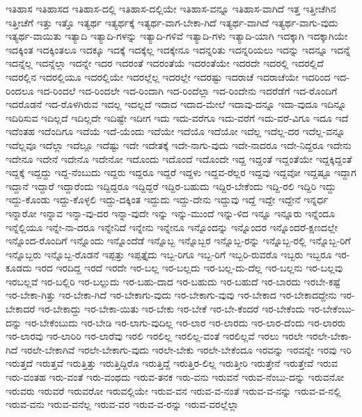 {ಇತಿಹಾಸ
ಇತಿಹಾಸದ
ಇತಿಹಾಸ-ದಲ್ಲಿ
ಇತಿಹಾಸ-ದಲ್ಲಿಯೇ
ಇತಿಹಾಸ-ವನ್ನೂ
ಇತಿಹಾಸ-ವಾಗಿದೆ
ಇತ್ತ
ಇತ್ತೀಚೆಗಿನ
ಇತ್ತೀಚೆಗೆ
ಇತ್ತು
ಇತ್ತೊ
ಇತ್ಯರ್ಥ
ಇತ್ಯರ್ಥಕ್ಕೆ
ಇತ್ಯರ್ಥ-ವಾಗ-ಬೇಕಾ-ಗಿದೆ
ಇತ್ಯರ್ಥ-ವಾಗಿದೆ
ಇತ್ಯರ್ಥ-ವಾಗು-ವುದು
ಇತ್ಯರ್ಥ-ವಾಯಿತು
ಇತ್ಯಾದಿ
ಇತ್ಯಾದಿ-ಗಳನ್ನು
ಇತ್ಯಾದಿ-ಗಳಿವೆ
ಇತ್ಯಾದಿ-ಗಳು
ಇತ್ಯಾದಿ-ಯಾಗಿ
ಇದಕ್ಕಾಗಿ
ಇದಕ್ಕಾಗಿಯೇ
ಇದಕ್ಕಿಂತ
ಇದಕ್ಕಿಂತಲೂ
ಇದಕ್ಕೂ
ಇದಕ್ಕೆ
ಇದಕ್ಕೆಲ್ಲ
ಇದಕ್ಕೇನೂ
ಇದನ್ನರಿತು
ಇದನ್ನರಿಯಲು
ಇದನ್ನು
ಇದನ್ನೂ
ಇದನ್ನೆ
ಇದನ್ನೆಲ್ಲ
ಇದನ್ನೆಲ್ಲಾ
ಇದನ್ನೇ
ಇದರ
ಇದರಂತೆ
ಇದರಂತೆಯೆ
ಇದರಂತೆಯೇ
ಇದರದೇ
ಇದರಲ್ಲಿ
ಇದರಲ್ಲಿದೆ
ಇದರಲ್ಲಿನ
ಇದರಲ್ಲಿಯೂ
ಇದರಲ್ಲಿಯೇ
ಇದರಲ್ಲೆಲ್ಲ
ಇದರಲ್ಲೇ
ಇದರಷ್ಟು
ಇದರಾಚೆ
ಇದರಾಚೆಯೇ
ಇದರಿಂದ
ಇದ-ರಿಂದಲೂ
ಇದ-ರಿಂದಲೆ
ಇದ-ರಿಂದಲೇ
ಇದ-ರಿಂದಾಗಿ
ಇದ-ರಿಂದೆಲ್ಲಾ
ಇದ-ರಿಂದೇನು
ಇದರೆಡೆಗೆ
ಇದ-ರೊಂದಿಗೆ
ಇದರೊಡನೆ
ಇದ-ರೊಳಗಿರುವ
ಇದಲ್ಲ
ಇದಲ್ಲದೆ
ಇದಾದ
ಇದಾದ-ಮೇಲೆ
ಇದಾವು-ದನ್ನೂ
ಇದಾ-ವುದೂ
ಇದಿನ್ನೂ
ಇದಿರಿಸುವ
ಇದಿಲ್ಲದೆ
ಇದಿಲ್ಲದೇ
ಇದಿಷ್ಟೇ
ಇದೀಗ
ಇದು
ಇದು-ವರೆಗೂ
ಇದು-ವರೆಗೆ
ಇದು-ವರೆ-ವಿಗೂ
ಇದೂ
ಇದೆ
ಇದೆಂತಹ
ಇದೆಂದಿಗೂ
ಇದೆಯೆ
ಇದೆ-ಯೆಂದು
ಇದೆಯೇ
ಇದೆಯೊ
ಇದೆಯೋ
ಇದೆಲ್ಲ
ಇದೆಲ್ಲ-ದರ
ಇದೆಲ್ಲ-ವನ್ನೂ
ಇದೆಲ್ಲವೂ
ಇದೆಲ್ಲಾ
ಇದೆಲ್ಲೂ
ಇದೆಷ್ಟು
ಇದೇ
ಇದೇತಕ್ಕೆ
ಇದೇ-ನಾಗು-ವುದು
ಇದೇ-ನಾದರೂ
ಇದೇ-ನಿದ್ದರೂ
ಇದೇನು
ಇದೇನೂ
ಇದೇನೆ
ಇದೇನೊ
ಇದೇನೋ
ಇದೊಂದು
ಇದೊಂದೆ
ಇದೊಂದೇ
ಇದ್ದ
ಇದ್ದಂತೆ
ಇದ್ದಂತೆಯೇ
ಇದ್ದಕ್ಕಿದ್ದಂತೆ
ಇದ್ದಕ್ಕೆ
ಇದ್ದದ್ದು
ಇದ್ದ-ನೆಂಬುದು
ಇದ್ದರು
ಇದ್ದರೂ
ಇದ್ದರೆ
ಇದ್ದಳು
ಇದ್ದವ-ರೆಲ್ಲರ
ಇದ್ದವು
ಇದ್ದವೋ
ಇದ್ದಷ್ಟೂ
ಇದ್ದಾಗ
ಇದ್ದಾನೆ
ಇದ್ದಾರೆ
ಇದ್ದಾರೆಂದು
ಇದ್ದಿದ್ದರೂ
ಇದ್ದಿದ್ದರೆ
ಇದ್ದಿರ-ಬಹುದು
ಇದ್ದಿರ-ಬೇಕೆಂದು
ಇದ್ದಿ-ರಲಿ
ಇದ್ದಿರಿ
ಇದ್ದು
ಇದ್ದು-ಕೊಂಡು
ಇದ್ದು-ಕೊಳ್ಳಲಿ
ಇದ್ದು-ದಕ್ಕಿಂತ
ಇದ್ದುದು
ಇದ್ದು-ದೇನು
ಇದ್ದುವು
ಇದ್ದೆ
ಇದ್ದೇ
ಇದ್ದೇನೆ
ಇನ್ನರ್ಧ
ಇನ್ನಾರೋ
ಇನ್ನಾವ
ಇನ್ನಾ-ವು-ದರ
ಇನ್ನಾ-ವುದೇ
ಇನ್ನು
ಇನ್ನು-ಮುಂದೆ
ಇನ್ನು-ಳಿದ
ಇನ್ನೂ
ಇನ್ನೂರು
ಇನ್ನೆಂದೂ
ಇನ್ನೆಲ್ಲಿಯೂ
ಇನ್ನೇ-ನಾ-ದರೂ
ಇನ್ನೇನಿದೆ
ಇನ್ನೇನು
ಇನ್ನೇನೂ
ಇನ್ನೊಂದನ್ನು
ಇನ್ನೊಂದರ
ಇನ್ನೊಂದರೆ-ಕ್ಷಣದಲ್ಲೇ
ಇನ್ನೊಂದ-ರೊಂದಿಗೆ
ಇನ್ನೊಂದು
ಇನ್ನೊಂದೆಡೆ
ಇನ್ನೊಬ್ಬ
ಇನ್ನೊಬ್ಬರ
ಇನ್ನೊಬ್ಬ-ರನ್ನು
ಇನ್ನೊಬ್ಬ-ರಲ್ಲಿ
ಇನ್ನೊಬ್ಬ-ರಿಗೆ
ಇನ್ನೊಬ್ಬರು
ಇನ್ನೊಬ್ಬ-ರೊಡನೆ
ಇಪ್ಪತ್ತು
ಇಪ್ಪತ್ತೈದು
ಇಬ್ಬ-ರಿಗೂ
ಇಬ್ಬ-ರಿಗೆ
ಇಬ್ಬರಿ-ರುವರೊ
ಇಬ್ಬರು
ಇಬ್ಬರೂ
ಇರ-ಕೂಡದು
ಇರದ
ಇರದಿದ್ದ
ಇರದೆ
ಇರದೇ
ಇರ-ಬಲ್ಲ
ಇರ-ಬಲ್ಲದು
ಇರ-ಬಲ್ಲ-ದು-ದೆಲ್ಲ
ಇರ-ಬಲ್ಲನು
ಇರ-ಬಲ್ಲವು
ಇರಬಲ್ಲವೆ
ಇರ-ಬಲ್ಲಿರಿ
ಇರ-ಬಲ್ಲುದು
ಇರ-ಬಹು-ದಾದ
ಇರ-ಬಹುದು
ಇರ-ಬಹುದೆ
ಇರ-ಬಾರದು
ಇರಬೇ-ಕಷ್ಟೆ
ಇರ-ಬೇಕಾ-ಗಿತ್ತು
ಇರ-ಬೇಕಾ-ಗಿದೆ
ಇರ-ಬೇಕಾಗು-ವುದು
ಇರ-ಬೇಕಾಗು-ವುವು
ಇರ-ಬೇಕಾದ
ಇರ-ಬೇಕಾದದ್ದೇನು
ಇರ-ಬೇಕಾದರೆ
ಇರ-ಬೇಕಾದ್ದು
ಇರ-ಬೇಕಾ-ಯಿತು
ಇರ-ಬೇಕು
ಇರ-ಬೇಕೆ
ಇರ-ಬೇ-ಕೆಂದರೆ
ಇರ-ಬೇಕೆಂದು
ಇರ-ಬೇಕೆಂಬು-ದನ್ನು
ಇರ-ಬೇಕೆಂಬುದು
ಇರ-ಬೇಡಿ
ಇರ-ಲಾಗು-ವುದಿಲ್ಲ
ಇರ-ಲಾರ
ಇರ-ಲಾರದು
ಇರ-ಲಾರ-ದೆಂದು
ಇರ-ಲಾರರು
ಇರ-ಲಾರವು
ಇರ-ಲಾರಿರಿ
ಇರ-ಲಾರೆವು
ಇರಲಿ
ಇರಲಿಲ್ಲ
ಇರಲಿಲ್ಲ-ವಂತೆ
ಇರಲಿಲ್ಲವೆ
ಇರಲು
ಇರಲೇ
ಇರಲೇ-ಬೇಕಾ-ಗಿದೆ
ಇರಲೇ-ಬೇಕಾಗಿವೆ
ಇರಲೇ-ಬೇಕಾಗು-ವುದು
ಇರಲೇ-ಬೇಕು
ಇರಲೇ-ಬೇಕೆಂದೂ
ಇರವನ್ನು
ಇರವನ್ನೇ
ಇರವು
ಇರಿ
ಇರುತ್ತದೆ
ಇರುತ್ತವೆ
ಇರುತ್ತಿತ್ತು
ಇರುತ್ತಿದ್ದಿರೊ
ಇರುತ್ತಿದ್ದೆ
ಇರುತ್ತಿರ-ಲಿಲ್ಲ
ಇರುತ್ತೀರಿ
ಇರುತ್ತೇನೆ
ಇರುತ್ತೇವೆ
ಇರುವ
ಇರು-ವಂತಹ
ಇರು-ವಂತೆ
ಇರು-ವಂಥದು
ಇರುವ-ತನಕ
ಇರು-ವನು
ಇರುವನೆ
ಇರುವ-ನೆಂಬು-ದನ್ನು
ಇರುವನೋ
ಇರುವರು
ಇರುವರೆ
ಇರುವರೋ
ಇರುವಲ್ಲಿಯೇ
ಇರುವ-ವನ
ಇರುವ-ವ-ನಂತೆ
ಇರುವ-ವ-ನನ್ನು
ಇರುವ-ವ-ನಲ್ಲಿ
ಇರುವ-ವನು
ಇರುವ-ವನೆಲ್ಲ
ಇರುವ-ವರ
ಇರುವ-ವ-ರನ್ನು
ಇರುವ-ವರಲ್ಲೆಲ್ಲಾ
}
